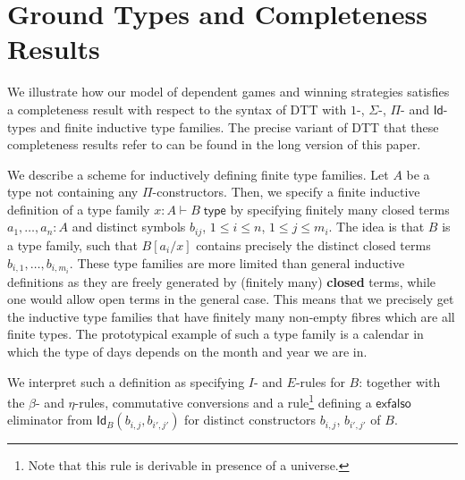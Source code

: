 \documentclass[runningheads,a4paper]{llncs}
\renewcommand{\emph}[1]{\textbf{#1}}
\begin{document}
\vspace{-14pt}
\section{Ground Types and Completeness Results}\label{sec:compl}
\vspace{-9pt}
We illustrate how our model of dependent games and winning strategies satisfies a completeness result with respect to the syntax of \textsf{DTT} with $1$-, $\Sigma$-, $\Pi$- and $\mathsf{Id}$-types and finite inductive type families. The precise variant of \textsf{DTT} that these completeness results refer to can be found in the long version of this paper.

We describe a scheme for inductively defining finite type families. Let $A$ be a type not containing any $\Pi$-constructors. Then, we specify a finite inductive definition of a type family $x:A\vdash B\;\mathsf{type}$ by specifying finitely many closed terms $a_1,\ldots, a_n :A$ and distinct symbols $b_{ij}$, $1\leq i\leq n$, $1\leq j\leq m_i$. The idea is that $B$ is a type family, such that $B[a_i/x]$ contains precisely the distinct closed terms $b_{i,1},\ldots,b_{i,m_i}$. These type families are more limited than general inductive definitions as they are freely generated by (finitely many) \emph{closed} terms, while one would allow open terms in the general case. This means that we precisely get the inductive type families that have finitely many non-empty fibres which are all finite types. The prototypical example of such a type family is a calendar in which the type of days depends on the month and year we are in.

We interpret such a definition as specifying $I$- and $E$-rules for $B$:\vspace{4pt}\linebreak
{}
together with the $\beta$- and $\eta$-rules, commutative conversions and a rule\footnote{Note that this rule is derivable in presence of a universe.} defining a $\mathsf{exfalso}$ eliminator from $\mathsf{Id}_B(b_{i,j},b_{i',j'})$ for distinct constructors $b_{i,j}$, $b_{i',j'}$ of $B$.
\end{document}
